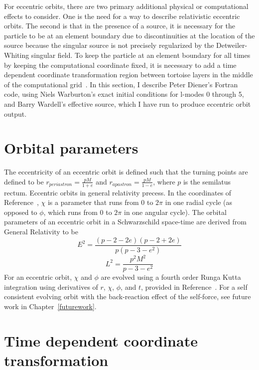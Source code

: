 For eccentric orbits, there are two primary additional physical or computational effects to consider. One is the need for a way to describe relativistic eccentric orbits. The second is that in the presence of a source, it is necessary for the particle to be at an element boundary due to discontinuities at the location of the source because the singular source is not precisely regularized by the Detweiler-Whiting singular field. To keep the particle at an element boundary for all times by keeping the computational coordinate fixed, it is necessary to add a time dependent coordinate transformation region between tortoise layers in the middle of the computational grid~\cite{time_dependent_coordinate_transform}. In this section, I describe Peter Diener's Fortran code, using Niels Warburton's exact initial conditions for l-modes 0 through 5, and Barry Wardell's effective source, which I have run to produce eccentric orbit output. 

\section{Orbital parameters}

The eccentricity of an eccentric orbit is defined such that the turning points are defined to be $r_{periastron}=\frac{pM}{1+e}$ and $r_{apastron}=\frac{pM}{1-e}$, where $p$ is the semilatus rectum. Eccentric orbits in general relativity precess. In the coordinates of Reference~\cite{pound_poisson}, $\chi$ is a parameter that runs from $0$ to $2\pi$ in one radial cycle (as opposed to $\phi$, which runs from $0$ to $2\pi$ in one angular cycle). The orbital parameters of an eccentric orbit in a Schwarzschild space-time are derived from General Relativity to be 
\begin{equation}
  E^2=\frac{(p-2-2e)(p-2+2e)}{p(p-3-e^2)}
\end{equation}
\begin{equation}
  L^2=\frac{p^2M^2}{p-3-e^2}
\end{equation}
For an eccentric orbit, $\chi$ and $\phi$ are evolved using a fourth order Runga Kutta integration using derivatives of $r$, $\chi$, $\phi$, and $t$, provided in Reference~\cite{pound_poisson}. For a self consistent evolving orbit with the back-reaction effect of the self-force, see future work in Chapter~\ref{futurework}. 


\section{Time dependent coordinate transformation}


